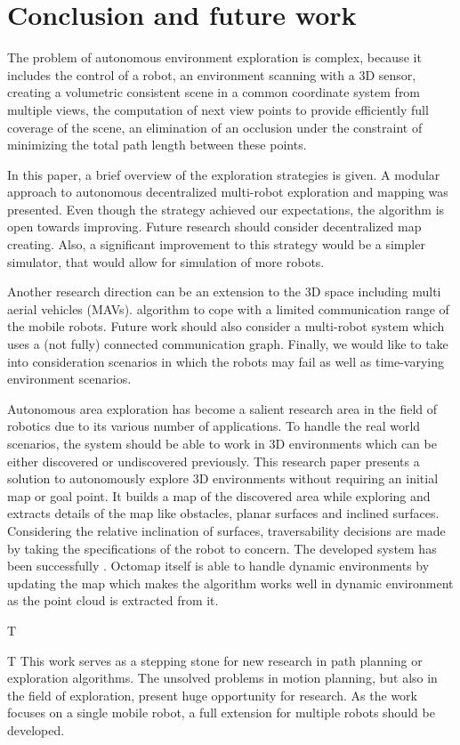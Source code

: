 \section{Conclusion and future work} \label{sec:conclusion}

The problem of autonomous environment exploration is complex, because it includes the control of a robot, an environment scanning with a 3D sensor, creating a volumetric consistent scene in a common coordinate system from multiple views, the computation of next view points to provide efficiently full coverage of the scene, an elimination of an 
occlusion under the constraint of minimizing the total
path length between these points. 

In this paper, a brief overview of the exploration strategies is given. 
A modular approach to autonomous decentralized multi-robot exploration and mapping was presented. Even though the strategy achieved our expectations, the algorithm is open towards improving. Future research should consider decentralized map creating. Also, a significant improvement to this strategy would be a simpler simulator, that would allow for simulation of more robots.

Another research direction can be an extension to the 3D space including multi aerial vehicles (MAVs).  algorithm to cope with a limited communication range of the mobile robots. Future work should also consider a multi-robot system which uses a (not fully) connected communication graph. Finally, we would like to take into consideration scenarios in which the robots may fail as well as time-varying environment scenarios.

Autonomous area exploration has become a salient research
area in the field of robotics due to its various number of
applications. To handle the real world scenarios, the system
should be able to work in 3D environments which can be either
discovered or undiscovered previously. This research paper
presents a solution to autonomously explore 3D environments
without requiring an initial map or goal point. It builds a map
of the discovered area while exploring and extracts details of
the map like obstacles, planar surfaces and inclined surfaces.
Considering the relative inclination of surfaces, traversability
decisions are made by taking the specifications of the robot
to concern. The developed system has been successfully . Octomap itself is able to handle
dynamic environments by updating the map which makes the
algorithm works well in dynamic environment as the point
cloud is extracted from it.

T


T This work serves as a stepping stone for new
research in path planning or exploration algorithms.
The unsolved problems in motion planning, but also in the
field of exploration, present huge opportunity for research.
 As the work focuses on a single mobile robot, a
full extension for multiple robots should be developed.